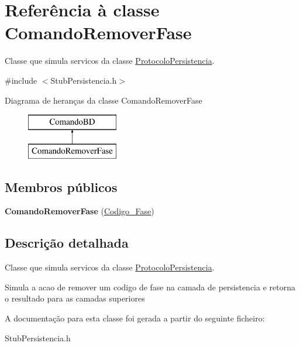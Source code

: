 \hypertarget{class_comando_remover_fase}{
\section{\-Referência à classe \-Comando\-Remover\-Fase}
\label{class_comando_remover_fase}
}


\-Classe que simula servicos da classe \hyperlink{class_protocolo_persistencia}{\-Protocolo\-Persistencia}.  




{\ttfamily \#include $<$\-Stub\-Persistencia.\-h$>$}

\-Diagrama de heranças da classe \-Comando\-Remover\-Fase\begin{figure}[H]
\begin{center}
\leavevmode
\includegraphics[height=2.000000cm]{class_comando_remover_fase}
\end{center}
\end{figure}
\subsection*{\-Membros públicos}
\begin{DoxyCompactItemize}
\item 
\hypertarget{class_comando_remover_fase_a40d326ecf59396ff1c4b00ac04bad15a}{
{\bfseries \-Comando\-Remover\-Fase} (\hyperlink{class_codigo___fase}{\-Codigo\-\_\-\-Fase})}
\label{class_comando_remover_fase_a40d326ecf59396ff1c4b00ac04bad15a}

\end{DoxyCompactItemize}


\subsection{\-Descrição detalhada}
\-Classe que simula servicos da classe \hyperlink{class_protocolo_persistencia}{\-Protocolo\-Persistencia}. 

\-Simula a acao de remover um codigo de fase na camada de persistencia e retorna o resultado para as camadas superiores 

\-A documentação para esta classe foi gerada a partir do seguinte ficheiro\-:\begin{DoxyCompactItemize}
\item 
\-Stub\-Persistencia.\-h\end{DoxyCompactItemize}
